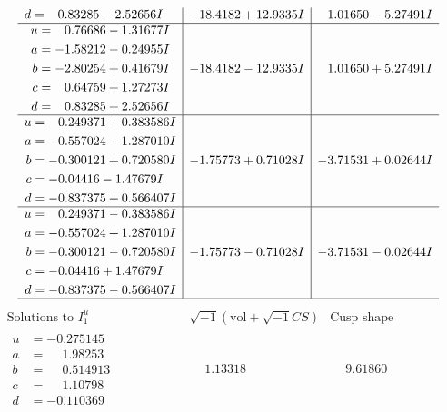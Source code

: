 \documentclass[1p]{elsarticle_modified}
\theoremstyle{definition}
\newcommand{\I}{\sqrt{-1}}
\begin{document}
$$\begin{array}{c|c|c}
\begin{aligned}
d &= \phantom{-}0.83285 - 2.52656 I\end{aligned}
 & -18.4182 + 12.9335 I & \phantom{-}1.01650 - 5.27491 I \\ \hline\begin{aligned}
u &= \phantom{-}0.76686 - 1.31677 I \\
a &= -1.58212 - 0.24955 I \\
b &= -2.80254 + 0.41679 I \\
c &= \phantom{-}0.64759 + 1.27273 I \\
d &= \phantom{-}0.83285 + 2.52656 I\end{aligned}
 & -18.4182 - 12.9335 I & \phantom{-}1.01650 + 5.27491 I \\ \hline\begin{aligned}
u &= \phantom{-}0.249371 + 0.383586 I \\
a &= -0.557024 - 1.287010 I \\
b &= -0.300121 + 0.720580 I \\
c &= -0.04416 - 1.47679 I \\
d &= -0.837375 + 0.566407 I\end{aligned}
 & -1.75773 + 0.71028 I & -3.71531 + 0.02644 I \\ \hline\begin{aligned}
u &= \phantom{-}0.249371 - 0.383586 I \\
a &= -0.557024 + 1.287010 I \\
b &= -0.300121 - 0.720580 I \\
c &= -0.04416 + 1.47679 I \\
d &= -0.837375 - 0.566407 I\end{aligned}
 & -1.75773 - 0.71028 I & -3.71531 - 0.02644 I\\
 \hline 
 \end{array}$$\newpage$$\begin{array}{c|c|c}  
\text{Solutions to }I^u_{1}& \I (\text{vol} + \sqrt{-1}CS) & \text{Cusp shape}\\
 \hline 
\begin{aligned}
u &= -0.275145\phantom{ +0.000000I} \\
a &= \phantom{-}1.98253\phantom{ +0.000000I} \\
b &= \phantom{-}0.514913\phantom{ +0.000000I} \\
c &= \phantom{-}1.10798\phantom{ +0.000000I} \\
d &= -0.110369\phantom{ +0.000000I}\end{aligned}
 & \phantom{-}1.13318\phantom{ +0.000000I} & \phantom{-}9.61860\phantom{ +0.000000I} \\ \hline\begin{aligned}

\end{aligned}
\end{array}$$
\end{document}
